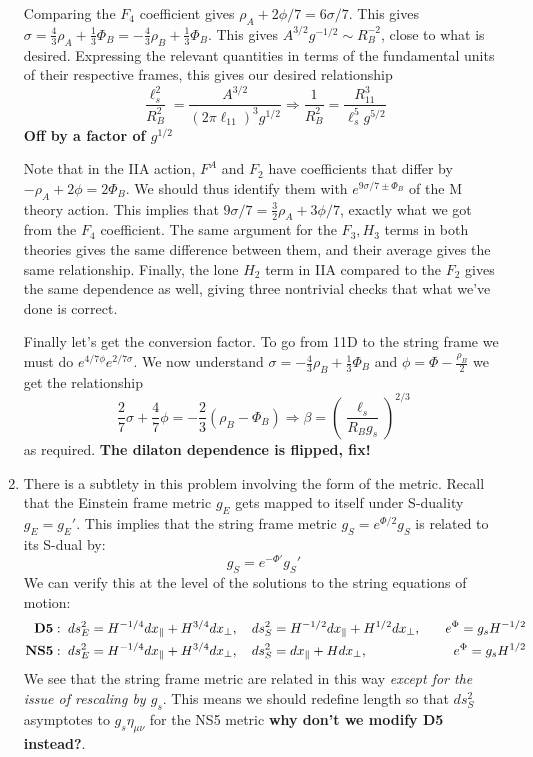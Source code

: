 \documentclass[11pt, class=article, crop=false]{standalone}
\begin{document}
\begin{enumerate}
	Comparing the $F_4$ coefficient gives $\rho_A + 2 \phi/7 = 6 \sigma/7$. This gives $\sigma = \frac43 \rho_A + \frac13 \Phi_B = -\frac43 \rho_B + \frac13 \Phi_B$. This gives $A^{3/2} g^{-1/2} \sim R_{B}^{-2}$, close to what is desired. Expressing the relevant quantities in terms of the fundamental units of their respective frames, this gives our desired relationship 
	\[
		\frac{\ell_s^2}{R_B^2} = \frac{A^{3/2}}{(2 \pi \ell_{11})^3 g^{1/2}} \Rightarrow \frac{1}{R_{B}^2} = \frac{R_{11}^3}{\ell_s^5 g^{5/2}}
	\]
	\textbf{Off by a factor of $g^{1/2}$}
	
	Note that in the IIA action, $F^A$ and $F_2$ have coefficients that differ by $-\rho_A + 2 \phi = 2 \Phi_B$. We should thus identify them with $e^{9 \sigma/7 \pm \Phi_B}$ of the M theory action. This implies that $9 \sigma / 7 = \frac32 \rho_A + 3 \phi/7$, exactly what we got from the $F_4$ coefficient. The same argument for the $F_3, H_3$ terms in both theories gives the same difference between them, and their average gives the same relationship. Finally, the lone $H_2$ term in IIA compared to the $F_2$ gives the same dependence as well, giving three nontrivial checks that what we've done is correct. 

	Finally let's get the conversion factor. To go from 11D to the string frame we must do $e^{4/7 \phi} e^{2/7 \sigma}$. We now understand $\sigma = -\frac{4}{3} \rho_B + \frac13 \Phi_B$ and $\phi = \Phi - \frac{\rho_B}{2}$ we get the relationship
	\[
		\frac27 \sigma + \frac47 \phi = - \frac23 (\rho_B - \Phi_B) \Rightarrow \beta = \left(\frac{\ell_s}{R_B g_s}\right)^{2/3}
	\]
	as required. 
	\textbf{The dilaton dependence is flipped, fix!}
	
	\item There is a subtlety in this problem involving the form of the metric. Recall that the Einstein frame metric $g_E$ gets mapped to itself under S-duality $g_E = g_E'$. This implies that the string frame metric $g_S = e^{\Phi/2} g_S$ is related to its S-dual by:
	\[
		g_S = e^{-\Phi'} g_S'
	\]
	We can verify this at the level of the solutions to the string equations of motion:
	\[
		\begin{aligned}
			\text{\textbf{D5}}: \; ds_E^2 &= H^{-1/4} dx_{\parallel} + H^{3/4} dx_\perp, \quad ds_S^2 = H^{-1/2} dx_\parallel + H^{1/2} dx_\perp, \quad &e^{\Phi} = g_s H^{-1/2} \\
			\text{\textbf{NS5}}: \; ds_E^2 &= H^{-1/4} dx_{\parallel} + H^{3/4} dx_\perp, \quad ds_S^2 =  dx_\parallel + H dx_\perp, \quad &e^{\Phi} = g_s H^{1/2}
		\end{aligned}
	\]
	We see that the string frame metric are related in this way \emph{except for the issue of rescaling by $g_s$}. This means we should redefine length so that $ds_S^2$ asymptotes to $g_s \eta_{\mu \nu}$ for the NS5 metric \textbf{why don't we modify D5 instead?}. 
	

\end{enumerate}
\end{document}
